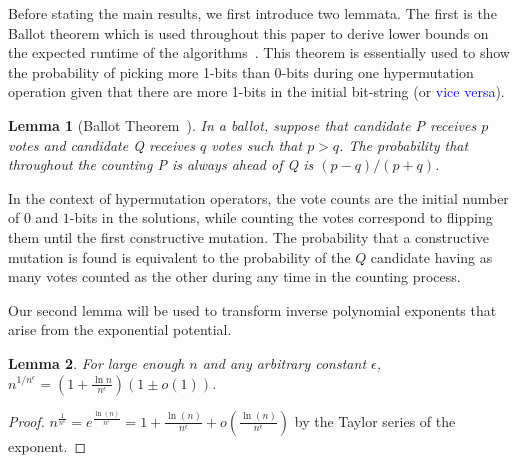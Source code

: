\documentclass[lettersize,journal]{IEEEtran}
\newcommand{\peter}[1]{\textcolor{blue}{#1}}
\newtheorem{lemma}{Lemma}
\begin{document}
Before stating the main results, we first introduce two lemmata. The first is the Ballot theorem which is used throughout this paper to derive lower bounds on the expected runtime of the algorithms~\cite{feller1968,JansenZarges2011,CorusOlivetoYazdani2019TCS}.  This theorem is essentially used to show the probability of picking more 1-bits than 0-bits during one hypermutation operation given that there are more 1-bits in the initial bit-string (or \peter{vice versa}). 
\begin{lemma} [Ballot Theorem~\cite{feller1968}] \label{lem:ballot} 
In a ballot, suppose that candidate P receives $p$ votes and candidate Q receives $q$ votes such that $p>q$. The probability that throughout the counting P is always ahead of Q is $(p-q)/(p+q)$. 
\end{lemma}

{\color{black}In the context of hypermutation operators, the vote counts are the initial number of $0$ and $1$-bits in the solutions, while counting the votes correspond to flipping them until the first constructive mutation. The probability that a constructive mutation is found is equivalent to the probability of the $Q$ candidate having as many votes counted as the other during any time in the counting process.}

Our second lemma will be used to transform inverse polynomial exponents that arise from the exponential potential.
\begin{lemma}\label{lem:expo}
	For large enough $n$ and {\color{black}any arbitrary constant} $\epsilon$, 
	$n^{1/n^{\epsilon}}= (1+\frac{\ln{n}}{n^{\epsilon}})(1 \pm o(1))$.
\end{lemma}
\begin{proof}
	$n^{\frac{1}{n^\epsilon}} = e^{\frac{\ln(n)}{n^\epsilon}} = 1 + \frac{\ln(n)}{n^\epsilon} + o(\frac{\ln(n)}{n^\epsilon})$ by the Taylor series of the exponent.
\end{proof}
\end{document}
